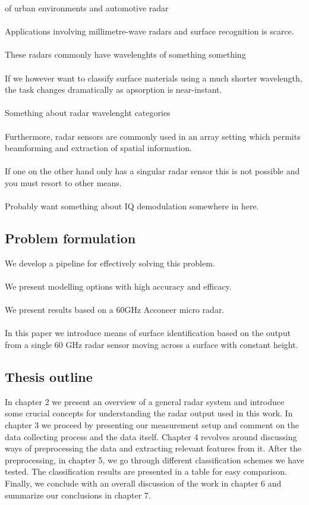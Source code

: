 \documentclass[a4paper, 12pt]{article}
\begin{document}
 of urban environments and automotive radar 
\\ \\
Applications involving millimetre-wave radars and surface recognition is scarce.  
\\ \\
These radars commonly have wavelenghts of something something
\\ \\
If we however want to classify surface materials using a much shorter wavelength, the task changes dramatically as apsorption is near-instant. 
\\ \\
Something about radar wavelenght categories
\\ \\
Furthermore, radar sensors are commonly used in an array setting which permits beamforming and extraction of spatial information. 
\\ \\
If one on the other hand only has a singular radar sensor this is not possible and you must resort to other means.
\\ \\
Probably want something about IQ demodulation somewhere in here.

\subsection{Problem formulation}

We develop a pipeline for effectively solving this problem. 
\\ \\
We present modelling options with high accuracy and efficacy. 
\\ \\ 
We present results based on a 60GHz Acconeer micro radar. 
\\ \\
In this paper we introduce means of surface identification based on the output from a single 60 GHz radar sensor moving across a surface with constant height. 

\subsection{Thesis outline}

In chapter 2 we present an overview of a general radar system and introduce some crucial concepts for understanding the radar output used in this work. In chapter 3 we proceed by presenting our measurement setup and comment on the data collecting process and the data itself. Chapter 4 revolves around discussing ways of preprocessing the data and extracting relevant features from it. After the preprocessing, in chapter 5, we go through different classification schemes we have tested. The classification results are presented in a table for easy comparison. Finally, we conclude with an overall discussion of the work in chapter 6 and summarize our conclusions in chapter 7.
\end{document}
